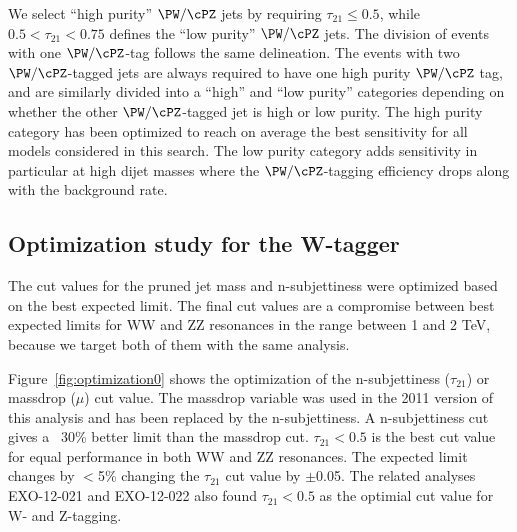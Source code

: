 
We select ``high purity'' $\PW/\cPZ$ jets by
requiring $\tau_{21} \leq 0.5$, while $ 0.5 <
\tau_{21} < 0.75$ defines the ``low purity'' $\PW/\cPZ$ jets.
%
The division of events with one $\PW/\cPZ$-tag follows the same delineation.
%
The events with two $\PW/\cPZ$-tagged jets are always required 
to have one high purity $\PW/\cPZ$ tag, and are similarly divided
into a ``high'' and ``low purity'' categories depending on whether
the other $\PW/\cPZ$-tagged jet is high or low purity.
%
The high purity category has been optimized to reach on average the
best sensitivity for all models considered in this search.  The low
purity category adds sensitivity in particular at high dijet masses
where the $\PW/\cPZ$-tagging efficiency drops along with the
background rate.

\subsection{Optimization study for the W-tagger}
\label{sec:optimal}

The cut values for the pruned jet mass and n-subjettiness were optimized based on the best expected limit.
The final cut values are a compromise between best expected limits for WW and ZZ resonances in the range between 1 and 2 TeV, because we target both of them with the same analysis.

Figure~\ref{fig:optimization0} shows the optimization of the n-subjettiness ($\tau_{21}$) or massdrop ($\mu$) cut value.
The massdrop variable was used in the 2011 version of this analysis and has been replaced by the n-subjettiness.
A n-subjettiness cut gives a ~30\% better limit than the massdrop cut.
$\tau_{21}<0.5$ is the best cut value for equal performance in both WW and ZZ resonances.
The expected limit changes by $<$5\% changing the $\tau_{21}$ cut value by $\pm$0.05.
The related analyses EXO-12-021 and EXO-12-022 also found $\tau_{21}<0.5$ as the optimial cut value for W- and Z-tagging.

